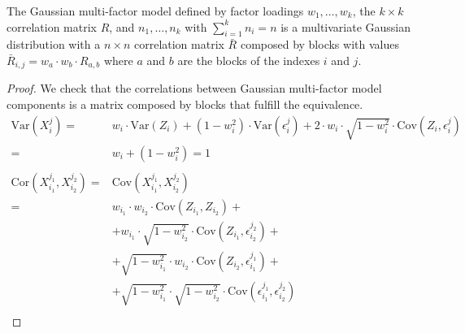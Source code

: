 \documentclass[11pt,fleqn]{book} %
\begin{document}
\begin{proposition}
	\label{prop:gmfigs}
	The Gaussian multi-factor model defined by factor loadings 
	$w_1,\dots,w_k$, the $k {\times} k$ correlation matrix $R$, and
	$n_1,\dots,n_k$ with $\sum_{i=1}^k n_i = n$ is a 
	multivariate Gaussian distribution with a $n {\times} n$ correlation
	matrix $\bar{R}$ composed by blocks with values
	$\bar{R}_{i,j} = w_a \cdot w_b \cdot R_{a,b}$ where $a$ and $b$ 
	are the blocks of the indexes $i$ and $j$.
\end{proposition}
\begin{proof}
	We check that the correlations between Gaussian multi-factor model
	components is a matrix composed by blocks that fulfill the equivalence.
	\begin{displaymath}
		\begin{array}{rl}
			\text{Var}(X_i^j) =                       &                                                                                                            
			w_i \cdot \text{Var}(Z_i) + (1-w_i^2) \cdot \text{Var}(\epsilon_i^j) +
			2 \cdot w_i \cdot \sqrt{1-w_i^2} \cdot \text{Cov}(Z_i, \epsilon_i^j) \\
			=                                         & w_i + (1-w_i^2) = 1                                                                                        \\
			                                          &                                                                                                            \\
			\text{Cor}(X_{i_1}^{j_1},X_{i_2}^{j_2}) = & \text{Cov}(X_{i_1}^{j_1},X_{i_2}^{j_2})                                                                    \\
			=                                         & w_{i_1} \cdot w_{i_2} \cdot \text{Cov}(Z_{i_1},Z_{i_2}) +                                                  \\
			                                          & + w_{i_1} \cdot \sqrt{1-w_{i_2}^2} \cdot \text{Cov}(Z_{i_1}, \epsilon_{i_2}^{j_2}) +                       \\
			                                          & + \sqrt{1-w_{i_1}^2} \cdot w_{i_2} \cdot \text{Cov}(Z_{i_2}, \epsilon_{i_1}^{j_1}) +                       \\
			                                          & + \sqrt{1-w_{i_1}^2} \cdot \sqrt{1-w_{i_2}^2} \cdot \text{Cov}(\epsilon_{i_1}^{j_1}, \epsilon_{i_2}^{j_2}) \\

\end{array}
\end{displaymath}
\end{proof}
\end{document}
